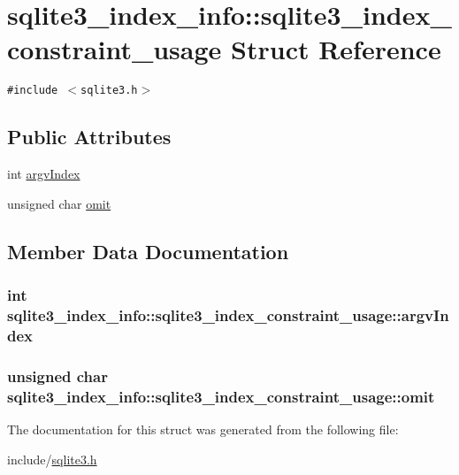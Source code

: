 \hypertarget{structsqlite3__index__info_1_1sqlite3__index__constraint__usage}{
\section{sqlite3\_\-index\_\-info::sqlite3\_\-index\_\-constraint\_\-usage Struct Reference}
\label{structsqlite3__index__info_1_1sqlite3__index__constraint__usage}
}
{\tt \#include $<$sqlite3.h$>$}

\subsection*{Public Attributes}
\begin{CompactItemize}
\item 
int \hyperlink{structsqlite3__index__info_1_1sqlite3__index__constraint__usage_2cbf680033c2937b3de226e091743a94}{argvIndex}
\item 
unsigned char \hyperlink{structsqlite3__index__info_1_1sqlite3__index__constraint__usage_d07fa17d30e4fb3abe23ceaf84edf0ef}{omit}
\end{CompactItemize}


\subsection{Member Data Documentation}
\hypertarget{structsqlite3__index__info_1_1sqlite3__index__constraint__usage_2cbf680033c2937b3de226e091743a94}{
\subsubsection[argvIndex]{\setlength{\rightskip}{0pt plus 5cm}int {\bf sqlite3\_\-index\_\-info::sqlite3\_\-index\_\-constraint\_\-usage::argvIndex}}}
\label{structsqlite3__index__info_1_1sqlite3__index__constraint__usage_2cbf680033c2937b3de226e091743a94}


\hypertarget{structsqlite3__index__info_1_1sqlite3__index__constraint__usage_d07fa17d30e4fb3abe23ceaf84edf0ef}{
\subsubsection[omit]{\setlength{\rightskip}{0pt plus 5cm}unsigned char {\bf sqlite3\_\-index\_\-info::sqlite3\_\-index\_\-constraint\_\-usage::omit}}}
\label{structsqlite3__index__info_1_1sqlite3__index__constraint__usage_d07fa17d30e4fb3abe23ceaf84edf0ef}




The documentation for this struct was generated from the following file:\begin{CompactItemize}
\item 
include/\hyperlink{sqlite3_8h}{sqlite3.h}\end{CompactItemize}

